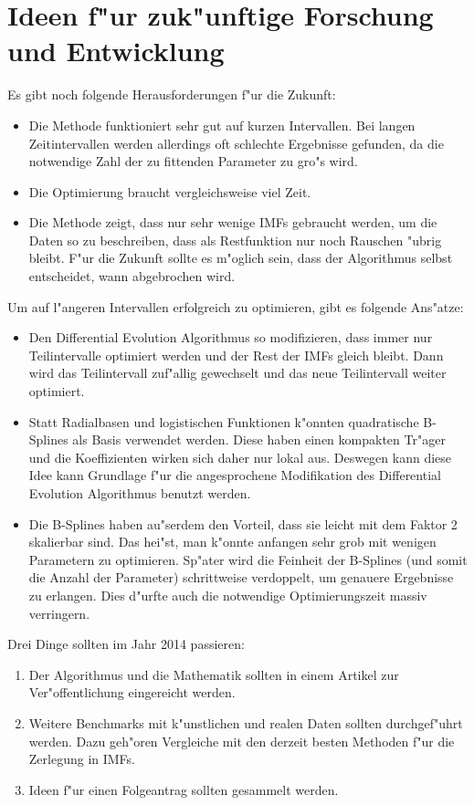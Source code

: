 \documentclass[a4paper]{scrartcl}
\begin{document}
\section{Ideen f"ur zuk"unftige Forschung und Entwicklung}

Es gibt noch folgende Herausforderungen f"ur die Zukunft:
\begin{itemize}
\item Die Methode funktioniert sehr gut auf kurzen Intervallen. 
Bei langen Zeitintervallen werden allerdings oft schlechte Ergebnisse gefunden, da die notwendige Zahl der zu fittenden Parameter zu gro"s wird. 
\item Die Optimierung braucht vergleichsweise viel Zeit.
\item Die Methode zeigt, dass nur sehr wenige IMFs gebraucht werden, um die Daten so zu beschreiben, dass als Restfunktion nur noch Rauschen "ubrig bleibt. 
F"ur die Zukunft sollte es m"oglich sein, dass der Algorithmus selbst entscheidet, wann abgebrochen wird. 
\end{itemize}
Um auf l"angeren Intervallen erfolgreich zu optimieren, gibt es folgende Ans"atze:
\begin{itemize}
\item Den Differential Evolution Algorithmus so modifizieren, dass immer nur Teilintervalle optimiert werden und der Rest der IMFs gleich bleibt. 
  Dann wird das Teilintervall zuf"allig gewechselt und das neue Teilintervall weiter optimiert. 
\item Statt Radialbasen und logistischen Funktionen k"onnten quadratische B-Splines als Basis verwendet werden. 
  Diese haben einen kompakten Tr"ager und die Koeffizienten wirken sich daher nur lokal aus. 
  Deswegen kann diese Idee kann Grundlage f"ur die angesprochene Modifikation des Differential Evolution Algorithmus benutzt werden. 
\item Die B-Splines haben au"serdem den Vorteil, dass sie leicht mit dem Faktor 2 skalierbar sind. 
  Das hei"st, man k"onnte anfangen sehr grob mit wenigen Parametern zu optimieren. 
  Sp"ater wird die Feinheit der B-Splines (und somit die Anzahl der Parameter) schrittweise verdoppelt, um genauere Ergebnisse zu erlangen. 
  Dies d"urfte auch die notwendige Optimierungszeit massiv verringern. 
\end{itemize}
Drei Dinge sollten im Jahr 2014 passieren:
\begin{enumerate}
  \item Der Algorithmus und die Mathematik sollten in einem Artikel zur Ver"offentlichung eingereicht werden. 
  \item Weitere Benchmarks mit k"unstlichen und realen Daten sollten durchgef"uhrt werden. 
  Dazu geh"oren Vergleiche mit den derzeit besten Methoden f"ur die Zerlegung in IMFs. 
  \item Ideen f"ur einen Folgeantrag sollten gesammelt werden. 
\end{enumerate}




\end{document}

